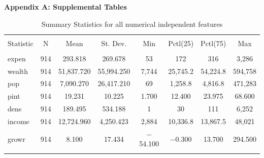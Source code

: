 \documentclass[11pt]{article}\usepackage[]{graphicx}\usepackage[]{color}
\begin{document}
\clearpage
\newpage
\noindent \Large{{\bf Appendix A: Supplemental Tables}}

\begin{center}

\begin{table}[H] \centering 
  \caption{Summary Statistics for all numerical independent features} 
  \label{descrips} 
\begin{tabular}{@{\extracolsep{5pt}}lccccccc} 
\\[-1.8ex]\hline 
\hline \\[-1.8ex] 
Statistic & \multicolumn{1}{c}{N} & \multicolumn{1}{c}{Mean} & \multicolumn{1}{c}{St. Dev.} & \multicolumn{1}{c}{Min} & \multicolumn{1}{c}{Pctl(25)} & \multicolumn{1}{c}{Pctl(75)} & \multicolumn{1}{c}{Max} \\ 
\hline \\[-1.8ex] 
expen & 914 & 293.818 & 269.678 & 53 & 172 & 316 & 3,286 \\ 
wealth & 914 & 51,837.720 & 55,994.250 & 7,744 & 25,745.2 & 54,224.8 & 594,758 \\ 
pop & 914 & 7,090.270 & 26,417.210 & 69 & 1,258.8 & 4,816.8 & 471,283 \\ 
pint & 914 & 19.231 & 10.225 & 1.700 & 12.400 & 23.975 & 68.600 \\ 
dens & 914 & 189.495 & 534.188 & 1 & 30 & 111 & 6,252 \\ 
income & 914 & 12,724.960 & 4,250.423 & 2,884 & 10,336.8 & 13,867.5 & 48,021 \\ 
growr & 914 & 8.100 & 17.434 & $-$54.100 & $-$0.300 & 13.700 & 294.500 \\ 
\hline \\[-1.8ex] 
\end{tabular} 
\end{table} 

\end{center} 
\end{document}
